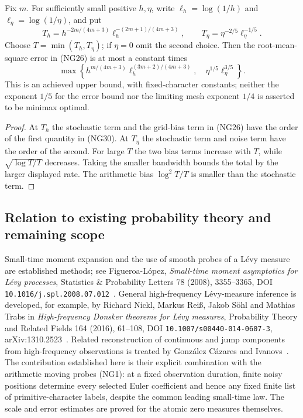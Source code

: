 \begin{corollary}
\label{cor:balanced-risk}
Fix $m$.  For sufficiently small positive $h,\eta$, write
$\ell_h=\log(1/h)$ and $\ell_\eta=\log(1/\eta)$, and put
\[
 T_h=h^{-2m/(4m+3)}\ell_h^{-(2m+1)/(4m+3)},\qquad
 T_\eta=\eta^{-2/5}\ell_\eta^{-1/5}.
\]
Choose $T=\min(T_h,T_\eta)$; if $\eta=0$ omit the second choice.
Then the root-mean-square error in (NG26) is at most a constant times
\[
 \max\left\{
 h^{m/(4m+3)}\ell_h^{(3m+2)/(4m+3)},\quad
 \eta^{1/5}\ell_\eta^{3/5}\right\}.                       \tag{NG30}
\]
This is an achieved upper bound, with fixed-character constants; neither
the exponent $1/5$ for the error bound nor the limiting mesh exponent
$1/4$ is asserted to be minimax optimal.
\end{corollary}

\begin{proof}
At $T_h$ the stochastic term and the grid-bias term in (NG26) have the
order of the first quantity in (NG30).  At $T_\eta$ the stochastic term
and noise term have the order of the second.  For large $T$ the two bias
terms increase with $T$, while $\sqrt{\log T/T}$ decreases.  Taking the
smaller bandwidth bounds the total by the larger displayed rate.
The arithmetic bias $\log^2T/T$ is smaller than the stochastic term.
\end{proof}

\subsection{Relation to existing probability theory and remaining scope}

Small-time moment expansion and the use of smooth probes of a L\'evy
measure are established methods; see Figueroa-L\'opez,
\emph{Small-time moment asymptotics for L\'evy processes},
Statistics \& Probability Letters 78 (2008), 3355--3365,
DOI \texttt{10.1016/j.spl.2008.07.012}~\cite{Figueroa2008}. General high-frequency
L\'evy-measure inference is developed, for example, by Richard Nickl,
Markus Rei\ss, Jakob S\"ohl and Mathias Trabs in
\emph{High-frequency Donsker theorems for L\'evy measures},
Probability Theory and Related Fields 164 (2016), 61--108,
DOI \texttt{10.1007/s00440-014-0607-3}, arXiv:1310.2523~\cite{Nickl2016}.
Related reconstruction of continuous and jump components from high-frequency observations is treated by Gonz\'alez C\'azares and Ivanovs~\cite{Gonzalez2021}.
The contribution established here is their explicit combination with
the arithmetic moving probes (NG1): at a fixed observation duration,
finite noisy positions determine every selected Euler coefficient and
hence any fixed finite list of primitive-character labels, despite the
common leading small-time law.  The scale and error estimates are proved
for the atomic zero measures themselves.

